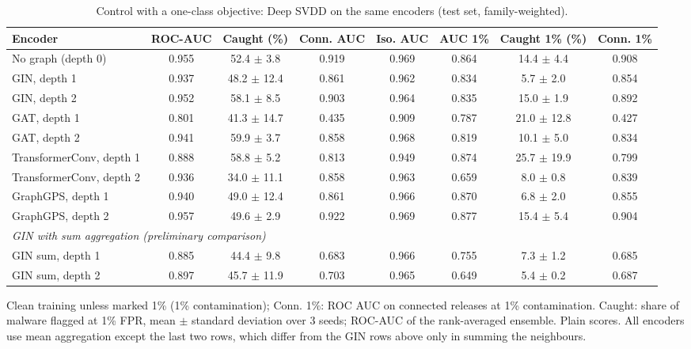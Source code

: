 \begin{table}[htbp]
\centering
\footnotesize
\caption{Control with a one-class objective: Deep SVDD on the same encoders (test set, family-weighted).}
\label{tab:svdd}
\begin{adjustbox}{max width=\linewidth}
\begin{tabular}{lccccccc}
\toprule
Encoder & ROC-AUC & Caught (\%) & Conn. AUC & Iso. AUC & AUC 1\% & Caught 1\% (\%) & Conn. 1\% \\
\midrule
No graph (depth 0) & 0.955 & 52.4 $\pm$ 3.8 & 0.919 & 0.969 & 0.864 & 14.4 $\pm$ 4.4 & 0.908 \\
GIN, depth 1 & 0.937 & 48.2 $\pm$ 12.4 & 0.861 & 0.962 & 0.834 & 5.7 $\pm$ 2.0 & 0.854 \\
GIN, depth 2 & 0.952 & 58.1 $\pm$ 8.5 & 0.903 & 0.964 & 0.835 & 15.0 $\pm$ 1.9 & 0.892 \\
GAT, depth 1 & 0.801 & 41.3 $\pm$ 14.7 & 0.435 & 0.909 & 0.787 & 21.0 $\pm$ 12.8 & 0.427 \\
GAT, depth 2 & 0.941 & 59.9 $\pm$ 3.7 & 0.858 & 0.968 & 0.819 & 10.1 $\pm$ 5.0 & 0.834 \\
TransformerConv, depth 1 & 0.888 & 58.8 $\pm$ 5.2 & 0.813 & 0.949 & 0.874 & 25.7 $\pm$ 19.9 & 0.799 \\
TransformerConv, depth 2 & 0.936 & 34.0 $\pm$ 11.1 & 0.858 & 0.963 & 0.659 & 8.0 $\pm$ 0.8 & 0.839 \\
GraphGPS, depth 1 & 0.940 & 49.0 $\pm$ 12.4 & 0.861 & 0.966 & 0.870 & 6.8 $\pm$ 2.0 & 0.855 \\
GraphGPS, depth 2 & 0.957 & 49.6 $\pm$ 2.9 & 0.922 & 0.969 & 0.877 & 15.4 $\pm$ 5.4 & 0.904 \\
\midrule
\multicolumn{8}{l}{\textit{GIN with sum aggregation (preliminary comparison)}} \\
GIN sum, depth 1 & 0.885 & 44.4 $\pm$ 9.8 & 0.683 & 0.966 & 0.755 & 7.3 $\pm$ 1.2 & 0.685 \\
GIN sum, depth 2 & 0.897 & 45.7 $\pm$ 11.9 & 0.703 & 0.965 & 0.649 & 5.4 $\pm$ 0.2 & 0.687 \\
\bottomrule
\end{tabular}
\end{adjustbox}
\par\smallskip
\parbox{0.95\linewidth}{\footnotesize Clean training unless marked 1\% (1\% contamination); Conn. 1\%: ROC AUC on connected releases at 1\% contamination. Caught: share of malware flagged at 1\% FPR, mean $\pm$ standard deviation over 3 seeds; ROC-AUC of the rank-averaged ensemble. Plain scores. All encoders use mean aggregation except the last two rows, which differ from the GIN rows above only in summing the neighbours.}
\end{table}
